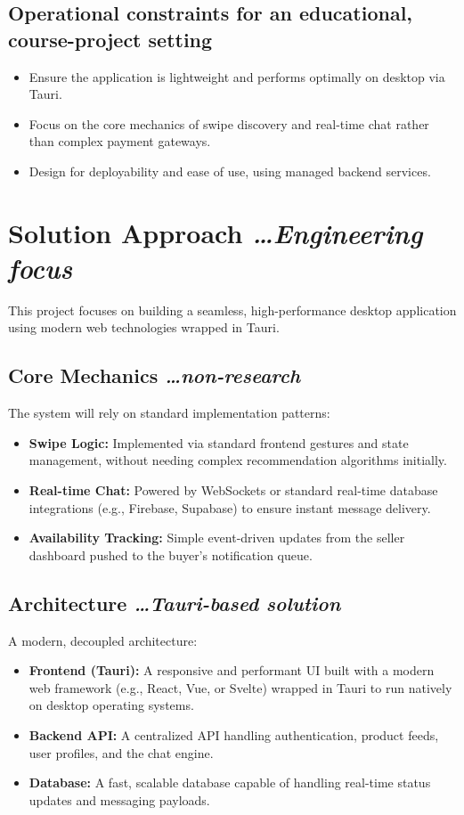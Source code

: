\documentclass[11pt,a4paper]{article}
\newcommand{\BvrHint}[1]{%
  {\normalfont\normalsize\itshape\hfill #1}}
\begin{document}
\subsection{Operational constraints for an educational, course-project setting}
\begin{itemize}[leftmargin=0.7cm]
    \item Ensure the application is lightweight and performs optimally on desktop via Tauri.
    \item Focus on the core mechanics of swipe discovery and real-time chat rather than complex payment gateways.
    \item Design for deployability and ease of use, using managed backend services.
\end{itemize}

\section{Solution Approach %
\BvrHint{\ldots Engineering focus}}
This project focuses on building a seamless, high-performance desktop application using modern web technologies wrapped in Tauri.

\subsection{Core Mechanics %
\BvrHint{\ldots non-research}}
The system will rely on standard implementation patterns:
\begin{itemize}[leftmargin=0.7cm]
    \item \textbf{Swipe Logic:} Implemented via standard frontend gestures and state management, without needing complex recommendation algorithms initially.
    \item \textbf{Real-time Chat:} Powered by WebSockets or standard real-time database integrations (e.g., Firebase, Supabase) to ensure instant message delivery.
    \item \textbf{Availability Tracking:} Simple event-driven updates from the seller dashboard pushed to the buyer's notification queue.
\end{itemize}

\subsection{Architecture %
\BvrHint{\ldots Tauri-based solution}}
A modern, decoupled architecture:
\begin{itemize}[leftmargin=0.7cm]
    \item \textbf{Frontend (Tauri):} A responsive and performant UI built with a modern web framework (e.g., React, Vue, or Svelte) wrapped in Tauri to run natively on desktop operating systems.
    \item \textbf{Backend API:} A centralized API handling authentication, product feeds, user profiles, and the chat engine.
    \item \textbf{Database:} A fast, scalable database capable of handling real-time status updates and messaging payloads.
\end{itemize}
\end{document}
